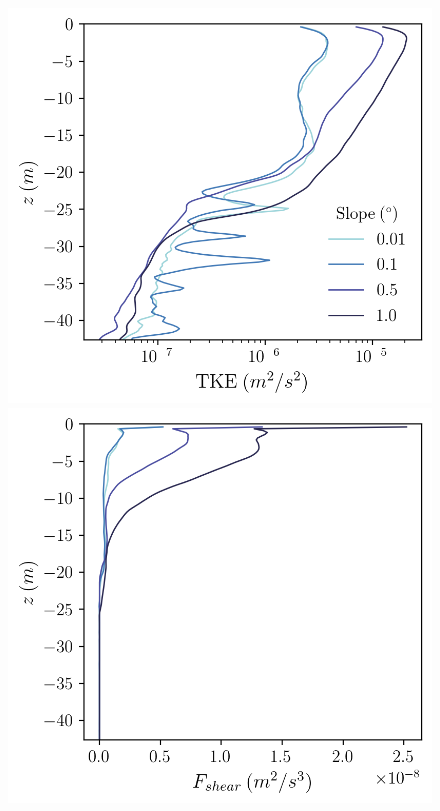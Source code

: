 \documentclass[draft]{agujournal2019}
\begin{document}
\begin{figure}
    \centering
    \begin{minipage}{0.5\textwidth}
        \includegraphics[trim={0 4.5cm 0 0},clip, width=\textwidth]{Figures/eres_cmp_dslope_43h_tav13h_z_profile.png}
    \end{minipage}%
    \begin{minipage}{0.5\textwidth}
        \includegraphics[trim={0 4cm 0 0},clip,width=\textwidth]{Figures/Fshear_cmp_dslope_43h_tav13h_z_profile.png}    

\end{minipage}
\end{figure}
\end{document}
